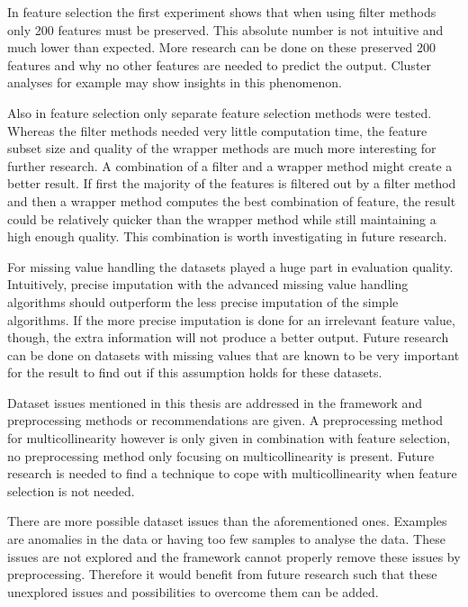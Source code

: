 \documentclass[10pt,a4paper]{report}
\begin{document}
	
	In feature selection the first experiment shows that when using filter methods only 200 features must be preserved. This absolute number is not intuitive and much lower than expected. More research can be done on these preserved 200 features and why no other features are needed to predict the output. Cluster analyses for example may show insights in this phenomenon.
	
	Also in feature selection only separate feature selection methods were tested. Whereas the filter methods needed very little computation time, the feature subset size and quality of the wrapper methods are much more interesting for further research. A combination of a filter and a wrapper method might create a better result. If first the majority of the features is filtered out by a filter method and then a wrapper method computes the best combination of feature, the result could be relatively quicker than the wrapper method while still maintaining a high enough quality. This combination is worth investigating in future research.
	
	
	For missing value handling the datasets played a huge part in evaluation quality. Intuitively, precise imputation with the advanced missing value handling algorithms should outperform the less precise imputation of the simple algorithms. If the more precise imputation is done for an irrelevant feature value, though, the extra information will not produce a better output. Future research can be done on datasets with missing values that are known to be very important for the result to find out if this assumption holds for these datasets.
	
	
	Dataset issues mentioned in this thesis are addressed in the framework and preprocessing methods or recommendations are given. A preprocessing method for multicollinearity however is only given in combination with feature selection, no preprocessing method only focusing on multicollinearity is present. Future research is needed to find a technique to cope with multicollinearity when feature selection is not needed.
	
	There are more possible dataset issues than the aforementioned ones. Examples are anomalies in the data or having too few samples to analyse the data. These issues are not explored and the framework cannot properly remove these issues by preprocessing. Therefore it would benefit from future research such that these unexplored issues and possibilities to overcome them can be added. 
	
\end{document}
